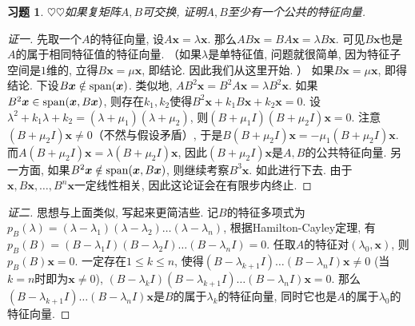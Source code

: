 \documentclass{ctexart}
\newtheorem{exercise}[thm]{习题}
\newcommand\bs[1]{\boldsymbol{ #1}}
\newcommand\hint[1]{\par {\footnotesize\kaishu 提示：#1}}
\def\hard{$\heartsuit$}
\DeclareMathOperator{\subspan}{span}
\DeclarePairedDelimiter\spanbasic{(}{)}
\newcommand\lspan[1]{\subspan\spanbasic*{#1}}
\begin{document}
\begin{exercise}
\hard\hard 如果复矩阵$A, B$可交换, 证明$A, B$至少有一个公共的特征向量. 

\end{exercise}
\begin{proof}[证一]
	先取一个$A$的特征向量, 设$A\bs x=\lambda\bs x$. 那么$AB\bs x=BA\bs x=\lambda B\bs x$. 可见$B\bs x$也是$A$的属于相同特征值的特征向量. 
	（如果$\lambda$是单特征值, 问题就很简单, 因为特征子空间是$1$维的, 立得$B\bs x=\mu \bs x$, 即结论. 因此我们从这里开始. ）
	如果$B\bs x=\mu \bs x$, 即得结论. 下设$B\bs x\notin\lspan{\bs x}$. 
	类似地, $AB^2\bs x=B^2 A\bs x=\lambda B^2\bs x$. 如果$B^2\bs x\in\lspan{\bs x,B\bs x}$, 则存在$k_1,k_2$使得$B^2\bs x+k_1B\bs x+k_2\bs x=0$. 设$\lambda^2+k_1\lambda+k_2=(\lambda+\mu_1)(\lambda+\mu_2)$, 则$(B+\mu_1I)(B+\mu_2I)\bs x=0$. 注意$(B+\mu_2I)\bs x\ne0$（不然与假设矛盾）, 于是$B(B+\mu_2I)\bs x=-\mu_1(B+\mu_2I)\bs x$. 而$A(B+\mu_2I)\bs x=\lambda(B+\mu_2I)\bs x$, 因此$(B+\mu_2I)\bs x$是$A,B$的公共特征向量. 
	另一方面, 如果$B^2\bs x\notin\lspan{\bs x,B\bs x}$, 则继续考察$B^3\bs x$. 如此进行下去. 
	由于$\bs x,B\bs x,\dots,B^n\bs x$一定线性相关, 因此这论证会在有限步内终止. 
\end{proof}
\begin{proof}[证二]
	思想与上面类似, 写起来更简洁些. 
	记$B$的特征多项式为$p_B(\lambda)=(\lambda-\lambda_1)(\lambda-\lambda_2)\dots(\lambda-\lambda_n)$, 根据Hamilton-Cayley定理, 有$p_B(B)=(B-\lambda_1I)(B-\lambda_2I)\dots(B-\lambda_nI)=0$. 
	任取$A$的特征对$(\lambda_0,\bs x)$, 则$p_B(B)\bs x=0$. 一定存在$1\leq k \leq n$, 使得$(B-\lambda_{k+1}I)\dots(B-\lambda_nI)\bs x\ne0 $ (当$k=n$时即为$\bs x\ne0$), $(B-\lambda_kI)(B-\lambda_{k+1}I)\dots(B-\lambda_nI)\bs x=0$. 
	那么$(B-\lambda_{k+1}I)\dots(B-\lambda_nI)\bs x$是$B$的属于$\lambda_k$的特征向量, 同时它也是$A$的属于$\lambda_0$的特征向量. 
\end{proof}
\end{document}
